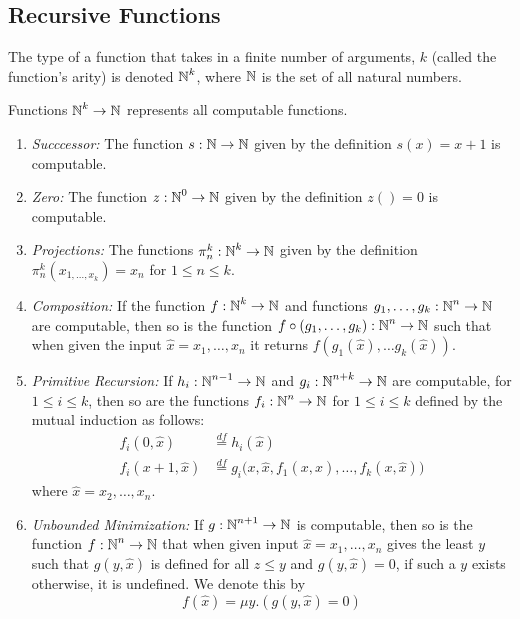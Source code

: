 \subsection{Recursive Functions}\label{subsec:Recursive_Functions}
The type of a function that takes in a finite number of arguments, $k$ (called the function's arity) is denoted $\operatorname{\mathbb{N}}^{k}$, where $\operatorname{\mathbb{N}}$ is the set of all natural numbers.

Functions $\operatorname{\mathbb{N}}^{k} \to \operatorname{\mathbb{N}}$ represents all computable functions.
\begin{enumerate}[noitemsep]
\item \emph{Succcessor:} The function $s : \operatorname{\mathbb{N}} \to \operatorname{\mathbb{N}}$ given by the definition $s(x) = x + 1$ is computable.
\item \emph{Zero:} The function $z : \operatorname{\mathbb{N}}^{0} \to \operatorname{\mathbb{N}}$ given by the definition $z() = 0$ is computable.
\item \emph{Projections:} The functions $\pi_{n}^{k} : \operatorname{\mathbb{N}}^{k} \to \operatorname{\mathbb{N}}$ given by the definition $\pi_{n}^{k}(x_{1, \ldots, x_{k}}) = x_{n}$ for $1 \leq n \leq k$.
\item \emph{Composition:} If the function $f : \operatorname{\mathbb{N}}^{k} \to \operatorname{\mathbb{N}}$ and functions $g_{1}, \ldots, g_{k} : \operatorname{\mathbb{N}}^{n} \to \operatorname{\mathbb{N}}$ are computable, then so is the function $f \circ (g_{1}, \ldots, g_{k}) : \operatorname{\mathbb{N}}^{n} \to \operatorname{\mathbb{N}}$ such that when given the input $\hat{x} = x_{1}, \ldots, x_{n}$ it returns $f(g_{1}(\hat{x}), \ldots g_{k}(\hat{x}))$.
\item \emph{Primitive Recursion:} If $h_{i} : \operatorname{\mathbb{N}}^{n-1} \to \operatorname{\mathbb{N}}$ and $g_{i} : \operatorname{\mathbb{N}}^{n+k} \to \operatorname{\mathbb{N}}$ are computable, for $1 \leq i \leq k$, then so are the functions $f_{i} : \operatorname{\mathbb{N}}^{n} \to \operatorname{\mathbb{N}}$ for $1 \leq i \leq k$ defined by the mutual induction as follows:
  \begin{align*}
    f_{i}(0, \hat{x}) &\overset{df}{=} h_{i}(\hat{x}) \\
    f_{i}(x+1, \hat{x}) &\overset{df}{=} g_{i} \bigl( x, \hat{x}, f_{1}(x, \hat{x}), \ldots, f_{k}(x, \hat{x}) \bigr)
  \end{align*}
  where $\hat{x} = x_{2}, \ldots, x_{n}$.
\item \emph{Unbounded Minimization:} If $g : \operatorname{\mathbb{N}}^{n+1} \to \operatorname{\mathbb{N}}$ is computable, then so is the function $f : \operatorname{\mathbb{N}}^{n} \to \operatorname{\mathbb{N}}$ that when given input $\hat{x} = x_{1}, \ldots, x_{n}$ gives the least $y$ such that $g(y, \hat{x})$ is defined for all $z \leq y$ and $g(y, \hat{x}) = 0$, if such a $y$ exists otherwise, it is undefined.
  We denote this by
  \begin{equation*}
    f(\hat{x}) = \mu y. (g (y, \hat{x}) = 0)
  \end{equation*}
\end{enumerate}

